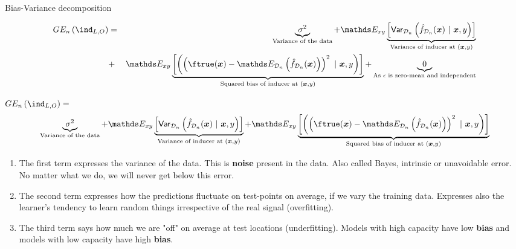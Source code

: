 \begin{vbframe} {Bias-Variance decomposition}
\begin{footnotesize}
\begin{eqnarray*}
\GEind 
  &=& \underbrace{\sigma^2}_{\text{Variance of the data}} + \E_{xy}\underbrace{\left[\var_{\D_n}\left(\fh_{\D_n}(\xv) ~|~\xv, y\right)\right]}_{\text{Variance of inducer at } (\xv, y)} \\ &+& \E_{xy}\underbrace{\left[\left(\left(\ftrue(\xv)-\E_{\D_n}\left(\fh_{\D_n}(\xv)\right)\right)^2~|~\xv, y\right)\right]}_{\text{Squared bias of inducer at } (\xv, y)} + \underbrace{0}_{\text{As $\epsilon$ is zero-mean and independent}}
\end{eqnarray*}
\end{footnotesize}


\framebreak 

\begin{footnotesize}
$\GEind =$  
$$
 \underbrace{\sigma^2}_{\text{Variance of the data}} + \E_{xy}\underbrace{\left[\var_{\D_n}\left(\fh_{\D_n}(\xv) ~|~\xv, y\right)\right]}_{\text{Variance of inducer at } (\xv, y)} + \E_{xy}\underbrace{\left[\left(\left(\ftrue(\xv)-\E_{\D_n}\left(\fh_{\D_n}(\xv)\right)\right)^2~|~\xv, y\right)\right]}_{\text{Squared bias of inducer at } (\xv, y)}  
$$
\end{footnotesize}
\begin{enumerate}
  \item The first term expresses the variance of the data. 
    This is \textbf{noise} present in the data.
    Also called Bayes, intrinsic or unavoidable error.
    No matter what we do, we will never get below this error.
  \item The second term expresses how the predictions fluctuate on test-points on average, if we vary the training data. Expresses also the learner's tendency to learn random things irrespective of the real signal (overfitting).
  \item The third term says how much we are "off" on average at test locations (underfitting).
    Models with high capacity have low \textbf{bias} and models with low capacity have high \textbf{bias}.
\end{enumerate}



\end{vbframe}
